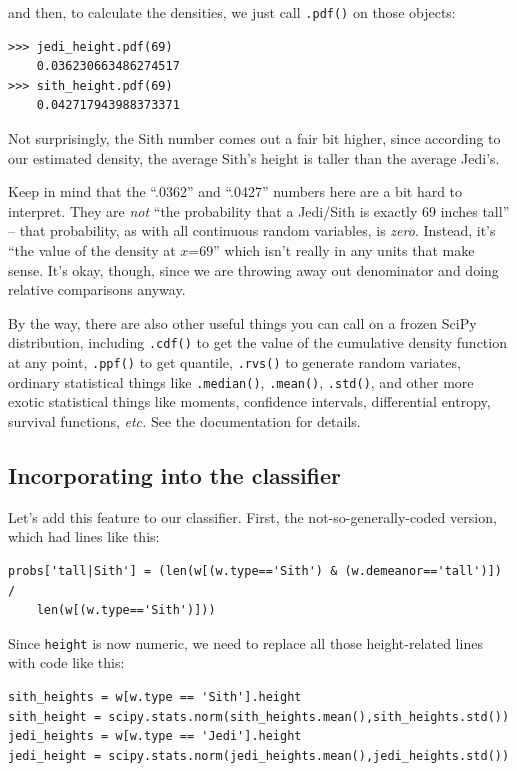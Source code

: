 and then, to calculate the densities, we just call \texttt{.pdf()} on those
objects:

\begin{Verbatim}[fontsize=\small,samepage=true,frame=single]
>>> jedi_height.pdf(69)
    0.036230663486274517
>>> sith_height.pdf(69)
    0.042717943988373371
\end{Verbatim}

Not surprisingly, the Sith number comes out a fair bit higher, since according
to our estimated density, the average Sith's height is taller than the average
Jedi's.

Keep in mind that the ``.0362'' and ``.0427'' numbers here are a bit hard to
interpret. They are \textit{not} ``the probability that a Jedi/Sith is exactly
69 inches tall'' -- that probability, as with all continuous random variables,
is \textit{zero}. Instead, it's ``the value of the density at $x$=69'' which
isn't really in any units that make sense. It's okay, though, since we are
throwing away out denominator and doing relative comparisons anyway.

By the way, there are also other useful things you can call on a frozen SciPy
distribution, including \texttt{.cdf()} to get the value of the cumulative
density function at any point, \texttt{.ppf()} to get quantile,
\texttt{.rvs()} to generate random variates, ordinary statistical things like
\texttt{.median()}, \texttt{.mean()}, \texttt{.std()}, and other more exotic
statistical things like moments, confidence intervals, differential entropy,
survival functions, \textit{etc.} See the documentation for details.

\subsection{Incorporating into the classifier}

Let's add this feature to our classifier. First, the not-so-generally-coded
version, which had lines like this:

\footnotesize
\begin{Verbatim}[fontsize=\small,samepage=true,frame=single]
probs['tall|Sith'] = (len(w[(w.type=='Sith') & (w.demeanor=='tall')]) /
    len(w[(w.type=='Sith')]))
\end{Verbatim}
\normalsize

Since \texttt{height} is now numeric, we need to replace all those
height-related lines with code like this:

\begin{Verbatim}[fontsize=\small,samepage=true,frame=single]
sith_heights = w[w.type == 'Sith'].height
sith_height = scipy.stats.norm(sith_heights.mean(),sith_heights.std())
jedi_heights = w[w.type == 'Jedi'].height
jedi_height = scipy.stats.norm(jedi_heights.mean(),jedi_heights.std())
\end{Verbatim}

